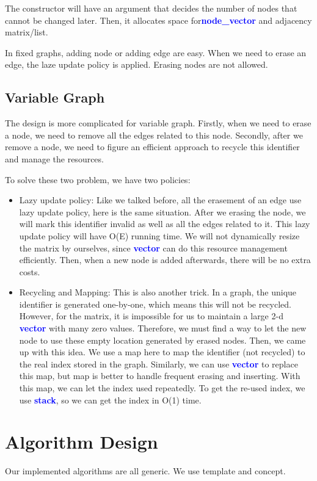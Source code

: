 \documentclass[]{article}
\begin{document}
The constructor will have an argument that decides the number of nodes that cannot be changed later. Then,
it allocates space for\textbf{\textcolor{blue}{node\_vector}} and adjacency matrix/list.

In fixed graphs, adding node or adding edge are easy. When we need to erase an edge, the laze update policy is applied. Erasing nodes are not allowed.

\subsection{Variable Graph}
The design is more complicated for variable graph. Firstly, when we need to erase a node, we need to remove all the edges related to this node.
Secondly, after we remove a node, we need to figure an efficient approach to recycle this identifier and manage the resources.

To solve these two problem, we have two policies:
\begin{itemize}
\item Lazy update policy: Like we talked before, all the erasement of an edge use lazy update policy, here is the same situation.
After we erasing the node, we will mark this identifier invalid as well as all the edges related to it. This lazy update policy will have O(E) running time.
We will not dynamically resize the matrix by ourselves, since \textbf{\textcolor{blue}{vector}} can do this resource management efficiently.
Then, when a new node is added afterwards, there will be no extra costs.
\item Recycling and Mapping: This is also another trick. In a graph, the unique identifier is generated one-by-one, which means this will not be recycled.
However, for the matrix, it is impossible for us to maintain a large 2-d \textbf{\textcolor{blue}{vector}} with many zero values. Therefore, we must
find a way to let the new node to use these empty location generated by erased nodes. Then, we came up with this idea. We use a map here to map the identifier (not recycled) to the real index stored in the graph.
Similarly, we can use \textbf{\textcolor{blue}{vector}} to replace this map, but map is better to handle frequent erasing and inserting. With this map, we can let the index used repeatedly.
To get the re-used index, we use \textbf{\textcolor{blue}{stack}}, so we can get the index in O(1) time. 
\end{itemize}

\section{Algorithm Design}
Our implemented algorithms are all generic. We use template and concept. 
\end{document}

